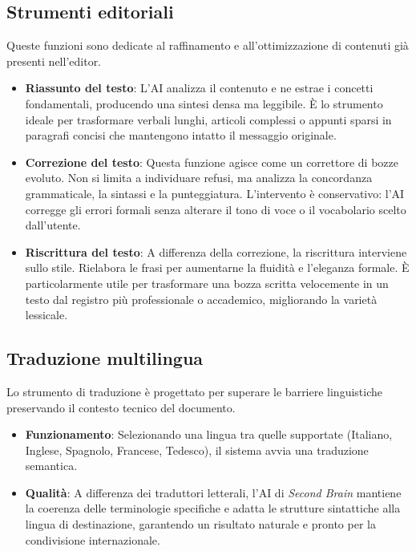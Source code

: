 \documentclass[11pt,a4paper]{article}
\begin{document}
\subsection{Strumenti editoriali}
Queste funzioni sono dedicate al raffinamento e all'ottimizzazione di contenuti già presenti nell'editor.
\begin{itemize}
    \item \textbf{Riassunto del testo}: L'AI analizza il contenuto e ne estrae i concetti fondamentali, producendo una sintesi densa ma leggibile. È lo strumento ideale per trasformare verbali lunghi, articoli complessi o appunti sparsi in paragrafi concisi che mantengono intatto il messaggio originale.
    \item \textbf{Correzione del testo}: Questa funzione agisce come un correttore di bozze evoluto. Non si limita a individuare refusi, ma analizza la concordanza grammaticale, la sintassi e la punteggiatura. L'intervento è conservativo: l'AI corregge gli errori formali senza alterare il tono di voce o il vocabolario scelto dall'utente.
    \item \textbf{Riscrittura del testo}: A differenza della correzione, la riscrittura interviene sullo stile. Rielabora le frasi per aumentarne la fluidità e l'eleganza formale. È particolarmente utile per trasformare una bozza scritta velocemente in un testo dal registro più professionale o accademico, migliorando la varietà lessicale.
\end{itemize}

\subsection{Traduzione multilingua}
Lo strumento di traduzione è progettato per superare le barriere linguistiche preservando il contesto tecnico del documento.
\begin{itemize}
    \item \textbf{Funzionamento}: Selezionando una lingua tra quelle supportate (Italiano, Inglese, Spagnolo, Francese, Tedesco), il sistema avvia una traduzione semantica.
    \item \textbf{Qualità}: A differenza dei traduttori letterali, l'AI di \textit{Second Brain} mantiene la coerenza delle terminologie specifiche e adatta le strutture sintattiche alla lingua di destinazione, garantendo un risultato naturale e pronto per la condivisione internazionale.
\end{itemize}
\end{document}
